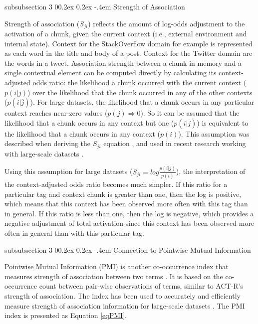 \documentclass[man,floatsintext,donotrepeattitle]{apa6}
\makeatletter
\renewcommand{\subsubsection}{%
  \@startsection
  {subsubsection}%
  {3}%
  {\parindent}%
  {0\baselineskip \@plus 0.2ex \@minus 0.2ex}%
  {-.4em}%
  {\normalfont\normalsize\bfseries\addperi}}
\makeatother
\begin{document}
\subsubsection{Strength of Association}

Strength of association ($S_{ji}$) reflects the amount of log-odds adjustment to the activation of a chunk, given the current context (i.e., external environment and internal state).
Context for the StackOverflow domain for example is represented as each word in the title and body of a post.
Context for the Twitter domain are the words in a tweet.
Association strength between a chunk in memory and a single contextual element can be computed directly by calculating its context-adjusted odds ratio:
the likelihood a chunk occurred with the current context ($p(i|j)$) over the likelihood that the chunk occurred in any of the other contexts ($p(i|\overline{j})$).
For large datasets, the likelihood that a chunk occurs in any particular context reaches near-zero values ($p(j) \Rightarrow 0$).
So it can be assumed that the likelihood that a chunk occurs in any context but one ($p(i|\overline{j})$) is equivalent to the likelihood that a chunk occurs in any context ($p(i)$).
This assumption was described when deriving the $S_{ji}$ equation \parencite{Anderson1989}, and used in recent research working with large-scale datasets \parencites{Stanley2013,Farahat2004,Douglass2010}.

Using this assumption for large datasets ($S_{ji} = log \frac{p(i|j)}{p(i)}$), the interpretation of the context-adjusted odds ratio becomes much simpler.
If this ratio for a particular tag and context chunk is greater than one, then the log is positive, which means that this context has been observed more often with this tag than in general.
If this ratio is less than one, then the log is negative, which provides a negative adjustment of total activation since this context has been observed more often in general than with this particular tag.

\subsubsection{Connection to Pointwise Mutual Information}

Pointwise Mutual Information (PMI) is another co-occurrence index that measures strength of association between two terms \parencite{Farahat2004}.
It is based on the co-occurrence count between pair-wise observations of terms, similar to ACT-R's strength of association.
The index has been used to accurately and efficiently measure strength of association information for large-scale datasets \parencite{Budiu2007,Farahat2004}.
The PMI index is presented as Equation \eqref{eqPMI}.
\end{document}
